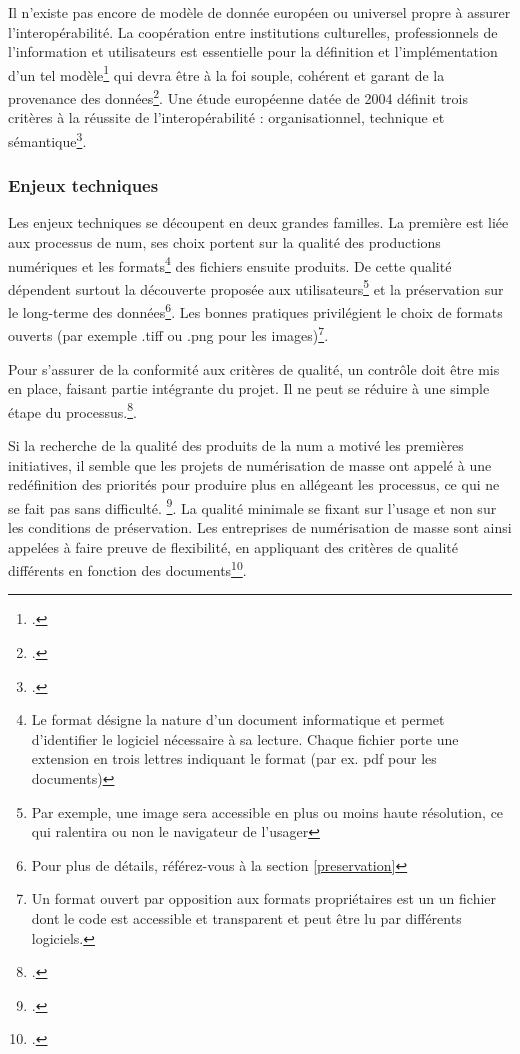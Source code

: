 Il n'existe pas encore de modèle de donnée européen ou universel propre à assurer l'interopérabilité. La coopération entre institutions culturelles, professionnels de l'information et utilisateurs est essentielle pour la définition et l'implémentation d'un tel modèle\footcite{rasmussen_pennington_connecting_2019} qui devra être à la foi souple, cohérent et garant de la provenance des données\footcite{institut_national_dhistoire_de_lart_lundisnum_nodate}. Une étude européenne datée de 2004 définit trois critères à la réussite de l'interopérabilité : organisationnel, technique et sémantique\footcite[p.565]{zharova_influence_2015}. 
\subsubsection{Enjeux techniques}

Les enjeux techniques se découpent en deux grandes familles. La première est liée aux processus de \gls{num}, ses choix portent sur la qualité des productions numériques et les formats\footnote{Le format désigne la nature d'un document informatique et permet d'identifier le logiciel nécessaire à sa lecture. Chaque fichier porte une extension en trois lettres indiquant le format (par ex. pdf pour les documents)} des fichiers ensuite produits. De cette qualité dépendent surtout la découverte proposée aux utilisateurs\footnote{Par exemple, une image sera accessible en plus ou moins haute résolution, ce qui ralentira ou non le navigateur de l'usager} et la préservation sur le long-terme des données\footnote{Pour plus de détails, référez-vous à la section \ref{preservation}}. Les bonnes pratiques privilégient le choix de formats ouverts (par exemple .tiff ou .png pour les images)\footnote{Un format ouvert par opposition aux formats propriétaires est un un fichier dont le code est accessible et transparent et peut être lu par différents logiciels.}. 

Pour s'assurer de la conformité aux critères de qualité, un contrôle doit être mis en place, faisant partie intégrante du projet. Il ne peut se réduire à une simple étape du processus.\footcite[p.271]{claerr_manuel_2011}.

Si la recherche de la qualité des produits de la \gls{num} a motivé les premières initiatives, il semble que les projets de numérisation de masse ont appelé à une redéfinition des priorités pour produire plus en allégeant les processus, ce qui ne se fait pas sans difficulté. \footcite[p.271]{claerr_manuel_2011}. La qualité minimale se fixant sur l'usage et non sur les conditions de préservation. Les entreprises de numérisation de masse sont ainsi appelées à faire preuve de flexibilité, en appliquant des critères de qualité différents en fonction des documents\footcite{xie_discover_2016}. 

